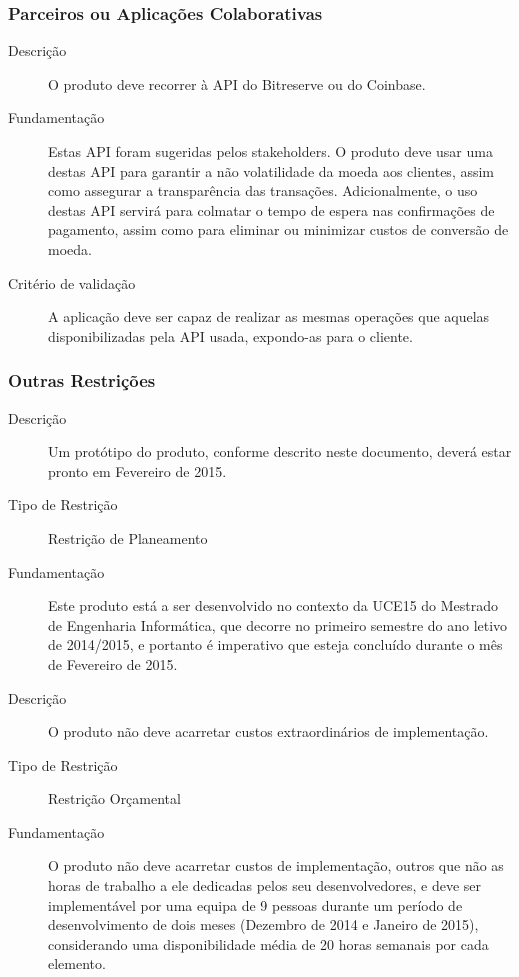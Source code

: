 \documentclass[12pt,a4paper]{article}
\begin{document}
    \subsubsection{Parceiros ou Aplicações Colaborativas}

      \begin{description}
        \item[Descrição]O produto deve recorrer à API do Bitreserve ou do Coinbase.
        \item[Fundamentação]Estas API foram sugeridas pelos stakeholders. O produto deve usar uma destas API para garantir a não volatilidade da moeda aos clientes, assim como assegurar a transparência das transações. Adicionalmente, o uso destas API servirá para colmatar o tempo de espera nas confirmações de pagamento, assim como para eliminar ou minimizar custos de conversão de moeda.
        \item[Critério de validação]A aplicação deve ser capaz de realizar as mesmas operações que aquelas disponibilizadas pela API usada, expondo-as para o cliente.
      \end{description}

    \subsubsection{Outras Restrições}  
      \begin{description}
        \item[Descrição]Um protótipo do produto, conforme descrito neste documento, deverá estar pronto em Fevereiro de 2015.

        \item[Tipo de Restrição]Restrição de Planeamento
        \item[Fundamentação]Este produto está a ser desenvolvido no contexto da UCE15 do Mestrado de Engenharia Informática, que decorre no primeiro semestre do ano letivo de 2014/2015, e portanto é imperativo que esteja concluído durante o mês de Fevereiro de 2015.
      \end{description}
\vspace{0.5cm}
      \begin{description}
        \item[Descrição]O produto não deve acarretar custos extraordinários de implementação.
        \item[Tipo de Restrição]Restrição Orçamental

        \item[Fundamentação]O produto não deve acarretar custos de implementação, outros que não as horas de trabalho a ele dedicadas pelos seu desenvolvedores, e deve ser implementável por uma equipa de 9 pessoas durante um período de desenvolvimento de dois meses (Dezembro de 2014 e Janeiro de 2015), considerando uma disponibilidade média de 20 horas semanais por cada elemento.
      \end{description}
\end{document}
